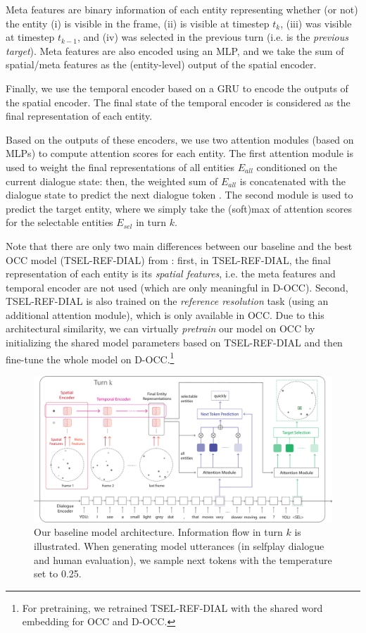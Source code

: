 Meta features are binary information of each entity representing whether (or not) the entity (i) is visible in the frame, (ii) is visible at timestep $t_{k}$, (iii) was visible at timestep $t_{k-1}$, and (iv) was selected in the previous turn (i.e. is the \textit{previous target}). Meta features are also encoded using an MLP, and we take the sum of spatial/meta features as the (entity-level) output of the spatial encoder.

Finally, we use the temporal encoder based on a GRU to encode the outputs of the spatial encoder. The final state of the temporal encoder is considered as the final representation of each entity.

Based on the outputs of these encoders, we use two attention modules (based on MLPs) to compute attention scores for each entity. The first attention module is used to weight the final representations of all entities $E_{all}$ conditioned on the current dialogue state: then, the weighted sum of $E_{all}$ is concatenated with the dialogue state to predict the next dialogue token \citep{xu2015show}. The second module is used to predict the target entity, where we simply take the (soft)max of attention scores for the selectable entities $E_{sel}$ in turn $k$.

Note that there are only two main differences between our baseline and the best OCC model (TSEL-REF-DIAL) from \citet{udagawa2020annotated}: first, in TSEL-REF-DIAL, the final representation of each entity is its \textit{spatial features}, i.e. the meta features and temporal encoder are not used (which are only meaningful in D-OCC). Second, TSEL-REF-DIAL is also trained on the \textit{reference resolution} task (using an additional attention module), which is only available in OCC. Due to this architectural similarity, we can virtually \textit{pretrain} our model on OCC by initializing the shared model parameters based on TSEL-REF-DIAL and then fine-tune the whole model on D-OCC.\footnote{For pretraining, we retrained TSEL-REF-DIAL with the shared word embedding for OCC and D-OCC.}

\begin{figure}[tb!]
\centering
\includegraphics[width=\textwidth]{overall_model_architecture.pdf}
\caption{Our baseline model architecture. Information flow in turn $k$ is illustrated.
When generating model utterances (in selfplay dialogue and human evaluation), we sample next tokens with the temperature set to 0.25.
}
\label{06_fig:model_architecture}
\end{figure}

